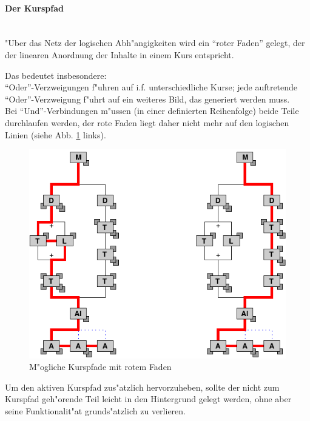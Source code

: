 \clearpage

\paragraph{Der Kurspfad}\mbox{ }\\[-2ex]

"Uber das Netz der logischen Abh"angigkeiten wird ein ``roter Faden''
gelegt, der der linearen Anordnung der Inhalte in einem Kurs
entspricht.

Das bedeutet insbesondere: \\
``Oder''-Verzweigungen f"uhren auf i.f. unterschiedliche Kurse; 
jede auftretende ``Oder''-Verzweigung f"uhrt auf ein weiteres Bild, 
das generiert werden muss.\\
Bei ``Und''-Verbindungen m"ussen (in einer definierten Reihenfolge) beide
Teile durchlaufen werden, der rote Faden liegt daher nicht mehr auf
den logischen Linien (siehe Abb. \ref{kurs_mit_rotem_faden} links).

\begin{figure}[h]
\begin{center}
\ifx\pdfoutput\undefined
\else
  \includegraphics{Skizzen/navi_drittel_kurs.pdf}
\fi
\caption{M"ogliche Kurspfade mit rotem Faden}\label{kurs_mit_rotem_faden}
\end{center}
\end{figure}

Um den aktiven Kurspfad zus"atzlich hervorzuheben, sollte der nicht
zum Kurspfad geh"orende Teil leicht in den Hintergrund gelegt werden,
ohne aber seine Funktionalit"at grunds"atzlich zu verlieren.

